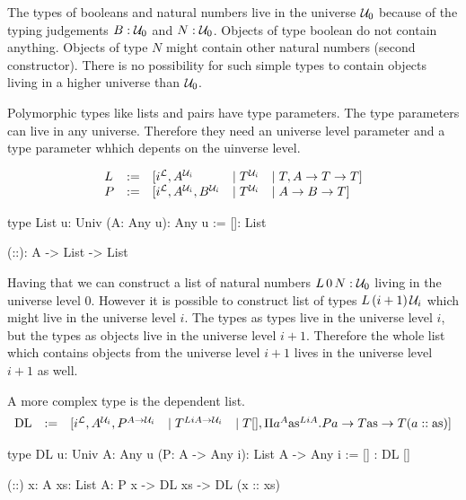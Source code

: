 The types of booleans and natural numbers live in the universe ${\mathcal U}_0$ because
of the typing judgements $B: {\mathcal U}_0$ and $N: {\mathcal U}_0$. Objects of type boolean do
not contain anything. Objects of type $N$ might contain other natural numbers
(second constructor). There is no possibility for such simple types to contain
objects living in a higher universe than ${\mathcal U}_0$.

Polymorphic types like lists and pairs have type parameters. The type parameters
can live in any universe. Therefore they need an universe level parameter and a
type parameter whhich depents on the uinverse level.

$$
\begin{array}{lllll}
    L &:=& [i^{\mathcal L}, A^{{\mathcal U}_i} &\mid T^{{\mathcal U}_i} &\mid T, A \to T \to T]
    \\
    P &:=& [i^{\mathcal L}, A^{{\mathcal U}_i}, B^{{\mathcal U}_i} &\mid T^{{\mathcal U}_i} &\mid A \to B \to T]
\end{array}
$$

\begin{alba}
    type List {u: Univ} (A: Any u): Any u :=
        []: List

        (::): A -> List -> List
\end{alba}



Having that we can construct a list of natural numbers $L\,0\,N: {\mathcal U}_0$ living
in the universe level $0$. However it is possible to construct list of types
$L\,(i+1)\,{\mathcal U}_i$ which might live in the universe level $i$. The types as
types live in the universe level $i$, but the types as objects live in the
universe level $i+1$. Therefore the whole list which contains objects from the
universe level $i + 1$ lives in the universe level $i+1$ as well.


A more complex type is the dependent list.
$$
\begin{array}{lllll}
    \text{DL} &:=&
    [
        i^{\mathcal L}, A^{{\mathcal U}_i}, P^{A \to {\mathcal U}_i}
        &\mid
        T^{LiA \to {\mathcal U}_i}
        &\mid
        T[],
        \Pi a^A \text{as}^{LiA}.
            Pa \to T\text{as} \to T(a :: \text{as})
    ]
\end{array}
$$

\begin{alba}
    type DL {u: Univ} {A: Any u} (P: A -> Any i): List A -> Any i :=
        [] : DL []

        (::) {x: A} {xs: List A}: P x -> DL xs -> DL (x :: xs)
\end{alba}

